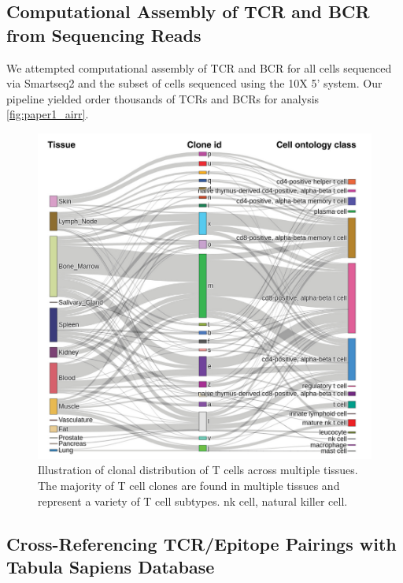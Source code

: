 \subsection{Computational Assembly of TCR and BCR from Sequencing Reads}
We attempted computational assembly of TCR and BCR for all cells sequenced via Smartseq2 and the subset of cells sequenced using the 10X 5' system. Our pipeline yielded order thousands of TCRs and BCRs for analysis \ref{fig:paper1_airr}. 

\begin{figure}[hbt!]
\centering
\includegraphics[width=14cm, keepaspectratio]{figs/paper1/fig4_sankey.png}
\caption[Sankey Plot of T cell clones in Tabula Sapiens]{Illustration of clonal distribution of T cells across multiple tissues. The majority of T cell clones are found in multiple tissues and represent a variety of T cell subtypes. nk cell, natural killer cell.}
\label{fig:paper1_sankey}
\end{figure}


\subsection{Cross-Referencing TCR/Epitope Pairings with Tabula Sapiens Database}

